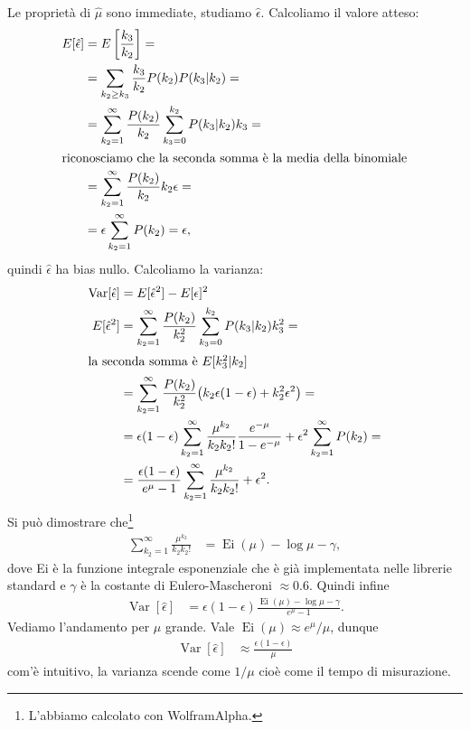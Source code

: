 \documentclass[a4paper]{article}
\begin{document}
Le proprietà di $\hat\mu$ sono immediate,
studiamo $\hat\epsilon$.
Calcoliamo il valore atteso:
\begin{align*}
	E[\hat\epsilon]
	&= E \left[ \frac{k_3}{k_2} \right] = \\
	&= \sum_{k_2\ge k_3} \frac{k_3}{k_2} P(k_2) P(k_3|k_2) = \\
	&= \sum_{k_2=1}^\infty \frac{P(k_2)}{k_2}
	\sum_{k_3=0}^{k_2} P(k_3|k_2) k_3 = \\
	\intertext{riconosciamo che la seconda somma è la media della binomiale}
	&= \sum_{k_2=1}^\infty \frac{P(k_2)}{k_2} k_2 \epsilon = \\
	&= \epsilon \sum_{k_2=1}^\infty P(k_2)
	= \epsilon,
\end{align*}
quindi $\hat\epsilon$ ha bias nullo.
Calcoliamo la varianza:
\begin{align*}
	\operatorname{Var}[\hat\epsilon]
	&= E[\hat\epsilon^2] - E[\epsilon]^2 \\
	E[\hat\epsilon^2]
	&= \sum_{k_2=1}^\infty \frac{P(k_2)}{k_2^2}
	\sum_{k_3=0}^{k_2} P(k_3|k_2) k_3^2 = \\
	\intertext{la seconda somma è $E[k_3^2|k_2]$}
	&= \sum_{k_2=1}^\infty \frac{P(k_2)}{k_2^2}
	\big (k_2\epsilon(1-\epsilon) + k_2^2\epsilon^2 \big) = \\
	&= \epsilon(1-\epsilon) \sum_{k_2=1}^\infty \frac{\mu^{k_2}}{k_2k_2!}\frac{e^{-\mu}}{1-e^{-\mu}}
	+ \epsilon^2 \sum_{k_2=1}^\infty P(k_2) = \\
	&= \frac{\epsilon(1-\epsilon)}{e^{\mu}-1} \sum_{k_2=1}^\infty \frac{\mu^{k_2}}{k_2k_2!} + \epsilon^2.
\end{align*}
Si può dimostrare che\footnote{L'abbiamo calcolato con WolframAlpha.}
\begin{align*}
	\sum_{k_2=1}^\infty \frac{\mu^{k_2}}{k_2k_2!}
	&= \operatorname{Ei}(\mu) - \log\mu - \gamma,
\end{align*}
dove Ei è la funzione integrale esponenziale che è già implementata nelle librerie standard
e $\gamma$ è la costante di Eulero-Mascheroni $\approx 0.6$.
Quindi infine
\begin{align*}
	\operatorname{Var}[\hat\epsilon]
	&= \epsilon(1-\epsilon)\frac{\operatorname{Ei}(\mu) - \log\mu - \gamma}{e^\mu - 1}.
\end{align*}
Vediamo l'andamento per $\mu$ grande.
Vale $\operatorname{Ei}(\mu) \approx e^{\mu}/\mu$, dunque
\begin{align*}
	\operatorname{Var}[\hat\epsilon]
	&\approx \frac{\epsilon(1-\epsilon)}{\mu}
\end{align*}
com'è intuitivo, la varianza scende come $1/\mu$ cioè come il tempo di misurazione.
\end{document}
